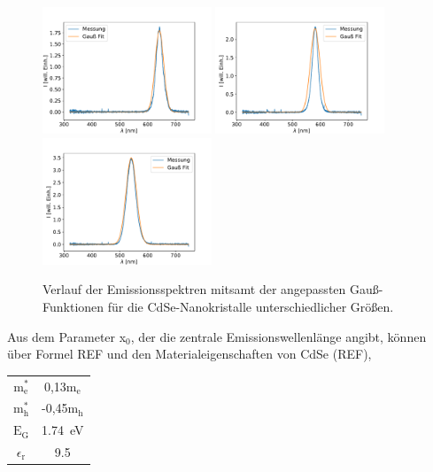         \begin{figure}[h]
        \centering
        \includegraphics[width = 0.45\textwidth]{Kristall_1.pdf}
        \includegraphics[width = 0.45\textwidth]{Kristall_2.pdf}
        \includegraphics[width = 0.45\textwidth]{Kristall_3.pdf}
        \label{fig:size_kol}
        \caption{Verlauf der Emissionsspektren mitsamt der angepassten Gauß-Funktionen für die CdSe-Nanokristalle unterschiedlicher Größen.}
        \end{figure}

        \FloatBarrier

        Aus dem Parameter x$_0$, der die zentrale Emissionswellenlänge angibt, können über Formel REF und den Materialeigenschaften von CdSe (REF),

        \begin{center}
            \label{tab:prop_CdSe}
            \begin{tabular}{c c}
                \toprule
                $\text{m}_{\text{e}}^*$ &  0,13$\text{m}_{\text{e}}$\\
                $\text{m}_{\text{h}}^*$ &  -0,45$\text{m}_{\text{h}}$\\
                $\text{E}_{\text{G}}$ &  \SI{1.74}{\electronvolt}\\
                $\epsilon_{\text{r}}$ &  \num{9.5}\\
                \bottomrule
            \end{tabular}
        \end{center}



